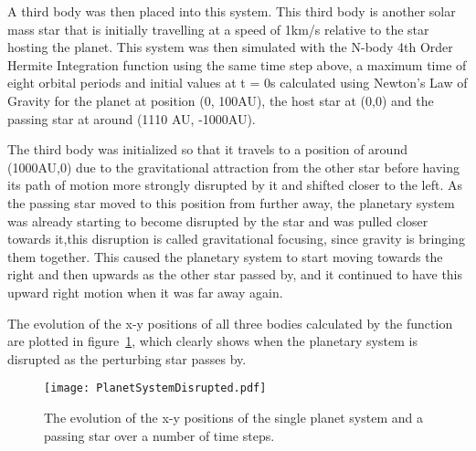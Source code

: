 \documentclass{article}
\begin{document}
\text\par{A third body was then placed into this system. This third body is another solar mass star that is initially travelling at a speed of 1km/s relative to the star hosting the planet. This system was then simulated with the N-body 4th Order Hermite Integration function using the same time step above, a maximum time of eight orbital periods and initial values at t = 0s calculated using Newton’s Law of Gravity for the planet at position (0, 100AU), the host star at (0,0) and the passing star at around (1110 AU, -1000AU).}
\\
\text\par{The third body was initialized so that it travels to a position of around (1000AU,0) due to the gravitational attraction from the other star before having its path of motion more strongly disrupted by it and shifted closer to the left. As the passing star moved to this position from further away, the planetary system was already starting to become disrupted by the star and was pulled closer towards it,this disruption is called gravitational focusing, since gravity is bringing them together.  This caused the planetary system to start moving towards the right and then upwards as the other star passed by, and it continued to have this upward right motion when it was far away again.
\\
\par{The evolution of the x-y positions of all three bodies calculated by the function are plotted in figure~\ref{fig:2}, which clearly shows when the planetary system is disrupted as the perturbing star passes by. } }
\begin{figure}[H]
    \centering
    \texttt{[image: PlanetSystemDisrupted.pdf]}
    \caption{The evolution of the x-y positions of the single planet system and a passing star over a number of time steps.}
    \label{fig:2}
\end{figure}
\\
\\
\end{document}
